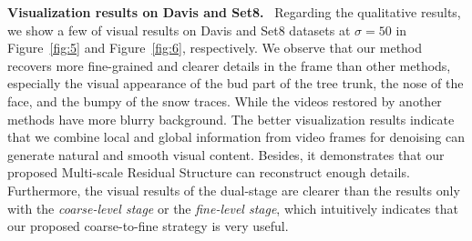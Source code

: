 \documentclass[journal]{IEEEtran}
\begin{document}
\noindent
\textbf{Visualization results on Davis and Set8.}~ 
Regarding the qualitative results, we show a few of visual results on Davis and Set8 datasets at $\sigma=50$ in Figure~\ref{fig:5} and Figure~\ref{fig:6}, respectively. 
We observe that our method recovers more fine-grained and clearer details in the frame than other methods, especially the visual appearance of the bud part of the tree trunk, the nose of the face, and the bumpy of the snow traces. While the videos restored by another methods have more blurry background. The better visualization results indicate that we combine local and global information from video frames for denoising can generate natural and smooth visual content. Besides, it demonstrates that our proposed Multi-scale Residual Structure can reconstruct enough details. Furthermore, the visual results of the dual-stage are clearer than the results only with the \emph{coarse-level stage} or the \emph{fine-level stage}, which intuitively indicates that our proposed coarse-to-fine strategy is very useful.

\begin{figure*}[t]
\begin{center}
\setlength{\fboxrule}{0pt}
\setlength{\fboxsep}{0cm}
\end{center}
\vspace{-2.5mm}
\caption{Denoising visualized results with Gaussian noise level $\sigma$ = 50 on Davis dataset of the proposed DSCT, coarse-level stage, fine-level stage and other state-of-the-art methods.
}
\label{fig:5}
\end{figure*}


\begin{figure*}[t]
\begin{center}
\setlength{\fboxrule}{0pt}
\setlength{\fboxsep}{0cm}
\end{center}
\vspace{-3.5mm}
\caption{Denoising visualized results with Gaussian noise level $\sigma$ = 50 on Set8 dataset of the proposed DSCT, coarse-level stage, fine-level stage and other state-of-the-art methods.
}
\label{fig:6}
\end{figure*}
\end{document}
